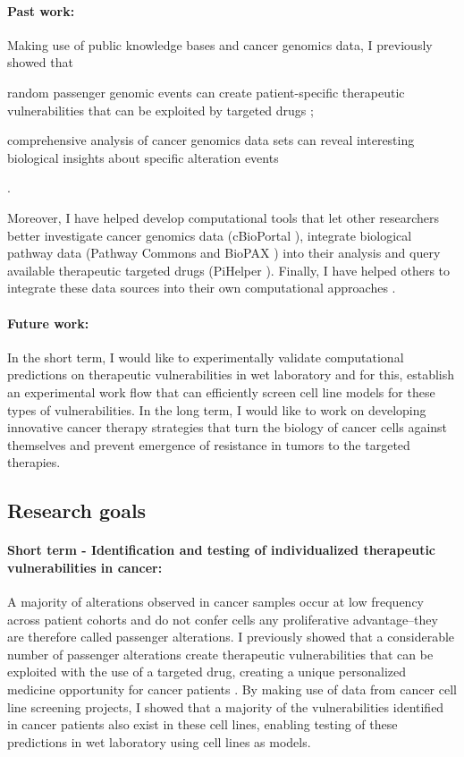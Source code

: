 \documentclass[11pt,letterpaper]{article}
\begin{document}
\paragraph{Past work:}
Making use of public knowledge bases and cancer genomics data, 
I previously showed that 
\begin{inparaenum}[(i)]
 \item random passenger genomic events can create patient-specific therapeutic vulnerabilities that can be exploited by targeted drugs \cite{aksoy2014prediction};
 \item comprehensive analysis of cancer genomics data sets can reveal interesting biological insights about specific alteration events \cite{aksoy2014cancer}
\end{inparaenum}.

Moreover, I have helped develop computational tools that let other researchers better 
investigate cancer genomics data (cBioPortal \cite{gao2014cbioportal, cerami2012cbio}),
integrate biological pathway data (Pathway Commons and BioPAX \cite{demir2013using,babur2014integrating})
into their analysis and query available therapeutic targeted drugs (PiHelper \cite{aksoy2013pihelper}).
Finally, I have helped others to integrate these data sources into their own computational approaches \cite{ciriello2013emerging,korkut2014perturbation,babur2014systematic}.

\paragraph{Future work:} 
In the short term, I would like to experimentally validate computational predictions on therapeutic vulnerabilities in wet laboratory
and for this, establish an experimental work flow that can efficiently screen cell line models for these types of vulnerabilities.
In the long term, I would like to work on developing innovative cancer therapy strategies that turn the biology of cancer cells against themselves and prevent emergence of resistance in tumors to the targeted therapies.

\subsection*{Research goals}
\paragraph{Short term - Identification and testing of individualized therapeutic vulnerabilities in cancer:}
A majority of alterations observed in cancer samples occur at low frequency across patient cohorts
and do not confer cells any proliferative advantage--they are therefore called passenger alterations.
I previously showed that a considerable number of passenger alterations create therapeutic vulnerabilities that can be exploited with the use of a targeted drug, creating a unique personalized medicine opportunity for cancer patients \cite{aksoy2014prediction}.
By making use of data from cancer cell line screening projects,
I showed that a majority of the vulnerabilities identified in cancer patients also exist in these cell lines,
enabling testing of these predictions in wet laboratory using cell lines as models.
\end{document}
